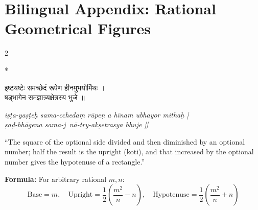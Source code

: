 \documentclass[11pt,a4paper]{article}
\newcommand{\dev}[1]{{\devanagarifont #1}}
\theoremstyle{definition}
\begin{document}
\vspace{0.8cm}

\section*{Bilingual Appendix: Rational Geometrical Figures}

\begin{paracol}{2}

\switchcolumn[0]*\noindent
\begin{tcolorbox}[colback=sktbg,colframe=vertrule,boxrule=0.5pt,arc=3pt,title={\small\bfseries\dev{समज्ञात्र्यक्षेत्र}} (Rational Triangle)]
\dev{इष्टयष्टेः समच्छेदं रूपेण हीनमुभयोर्मिथः ।\\
षड्भागेन समज्ञात्र्यक्षेत्रस्य भुजे ॥}
\end{tcolorbox}

\switchcolumn\noindent
\begin{tcolorbox}[colback=transbg,colframe=vertrule!60,boxrule=0.5pt,arc=3pt,title={\small\bfseries Rational Right Triangle}]
\textit{i\d{s}\d{t}a-ya\d{s}\d{t}e\d{h} sama-ccheda\d{m} r\=upe\d{n} a h\={i}nam ubhayor mitha\d{h} |\\
\d{s}a\d{d}-bh\=agena sama-j~n\=a-try-ak\d{s}etrasya bhuje ||}

``The square of the optional side divided and then diminished by an optional number; half the result is the upright (koti), and that increased by the optional number gives the hypotenuse of a rectangle.''

\textbf{Formula:} For arbitrary rational $m, n$:
\[
\text{Base} = m, \quad \text{Upright} = \frac{1}{2}\!\left(\frac{m^2}{n} - n\right), \quad \text{Hypotenuse} = \frac{1}{2}\!\left(\frac{m^2}{n} + n\right)
\]
\end{tcolorbox}

\end{paracol}

\vspace{0.3cm}
\end{document}
